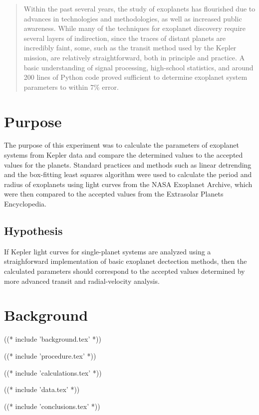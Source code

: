 \documentclass[12pt,oneside]{memoir}
\begin{document}
\begin{flushleft}
    \theauthor
    \par
    \thedate
\end{flushleft}
\par
\begin{center}
    \large\textbf{\thetitle}
\end{center}
\par

\begin{abstract}
    Within the past several years, the study of exoplanets has flourished due to advances in technologies and methodologies, as well as increased public awareness.
    While many of the techniques for exoplanet discovery require several layers of indirection, since the traces of distant planets are incredibly faint, some, such as
    the transit method used by the Kepler mission, are relatively straightforward, both in principle and practice. A basic understanding of signal processing, high-school statistics, and around 200 lines of Python code
    proved sufficient to determine exoplanet system parameters to within 7\% error.
\end{abstract}

\section{Purpose}

The purpose of this experiment was to calculate the parameters of exoplanet systems from Kepler data and compare the determined values to the accepted
values for the planets. Standard practices and methods such as linear detrending and the box-fitting least squares algorithm were used to calculate the
period and radius of exoplanets using light curves from the NASA Exoplanet Archive, which were then compared to the accepted values from the Extrasolar
Planets Encyclopedia.\autocite{exoplanetEncyclopedia, exoplanetArchive}

\subsection{Hypothesis}
If Kepler light curves for single-planet systems are analyzed using a straighforward implementation of basic exoplanet dectection methods, then
the calculated parameters should correspond to the accepted values determined by more advanced transit and radial-velocity analysis.

\section{Background}
% 
((* include 'background.tex' *))

% 
((* include 'procedure.tex' *))

((* include 'calculations.tex' *))

((* include 'data.tex' *))

((* include 'conclusions.tex' *))


\nocite{*}
\printbibliography
\end{document}
